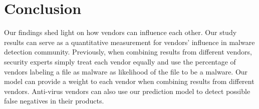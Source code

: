 \section{Conclusion}

Our findings shed light on how vendors can influence each other.
Our study results can serve as a quantitative measurement for vendors' influence in malware detection community. 
Previously, when combining results from different vendors, 
security experts simply treat each vendor equally and use the percentage of 
vendors labeling a file as malware as likelihood of the file to be a malware. 
Our model can provide a weight to each vendor 
when combining results from different vendors.  
Anti-virus vendors can also use our prediction model to detect possible false negatives in their products.

